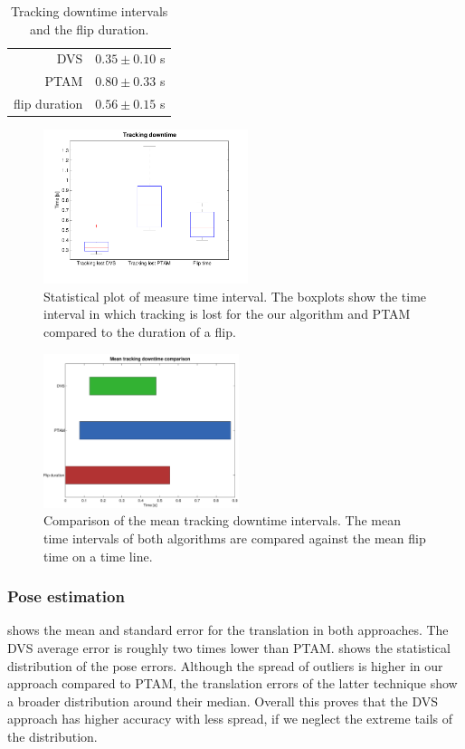 \begin{table}
\caption{\label{tab:downtime_tab} Tracking downtime intervals and the flip
duration.}
\centering %
\begin{tabular}{r|l}
\rule{0pt}{1em}DVS  & $0.35\pm0.10$ s\tabularnewline
PTAM  & $0.80\pm0.33$ s\tabularnewline
flip duration & $0.56\pm0.15$ s\tabularnewline
\end{tabular}
\end{table}


\begin{figure}[h]
\centering \includegraphics[height=4.5cm]{figures/flip_times} \caption{\label{img:fliptimes}Statistical plot of measure time interval. The
boxplots show the time interval in which tracking is lost for the
our algorithm and PTAM compared to the duration of a flip.}
\end{figure}


\begin{figure}[h]
\centering \includegraphics[height=4.5cm]{figures/mean_flip_times}
\caption{\label{img:mean_downtime} Comparison of the mean tracking downtime
intervals. The mean time intervals of both algorithms are compared
against the mean flip time on a time line.}
\end{figure}



\subsubsection{Pose estimation\label{sec:poseestimationeval}}

 shows the mean and standard error
for the translation in both approaches. The DVS average error is roughly
two times lower than PTAM.  shows
the statistical distribution of the pose errors. Although the spread
of outliers is higher in our approach compared to PTAM, the translation
errors of the latter technique show a broader distribution around
their median. Overall this proves that the DVS approach has higher
accuracy with less spread, if we neglect the extreme tails of the
distribution.

